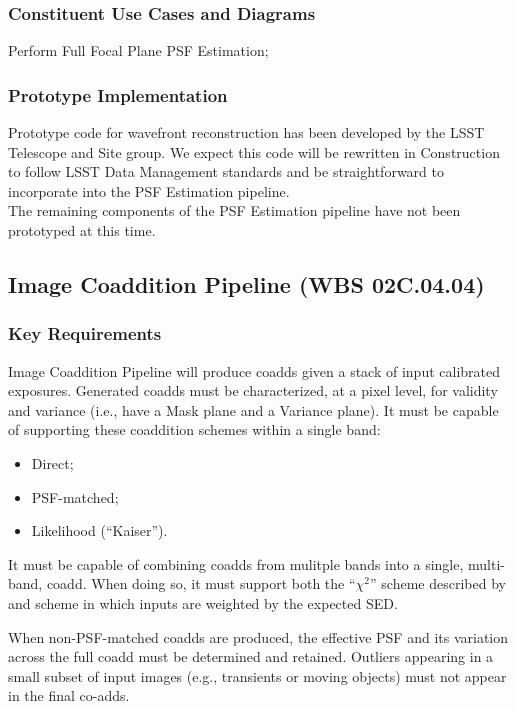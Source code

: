 \documentclass[12pt]{article}
\newcommand{\wbsCoadd}{WBS 02C.04.04}
\begin{document}
\subsubsection{Constituent Use Cases and Diagrams}

Perform Full Focal Plane PSF Estimation;

\subsubsection{Prototype Implementation}

Prototype code for wavefront reconstruction has been developed by the LSST Telescope and Site group. We expect this code will be rewritten in Construction to follow LSST Data Management standards and be straightforward to incorporate into the PSF Estimation pipeline.
\\

The remaining components of the PSF Estimation pipeline have not been prototyped at this time.

\clearpage

\subsection{Image Coaddition Pipeline (\wbsCoadd)}

\subsubsection{Key Requirements}

Image Coaddition Pipeline will produce coadds given a stack of input calibrated exposures. Generated coadds must be characterized, at a pixel level, for validity and variance (i.e., have a Mask plane and a Variance plane). It must be capable of supporting these coaddition schemes within a single band:
\begin{itemize}
    \item{Direct;}
    \item{PSF-matched;}
    \item{Likelihood (``Kaiser'').}
\end{itemize}

It must be capable of combining coadds from mulitple bands into a single, multi-band, coadd. When doing so, it must support both the ``$\chi^2$'' scheme described by \cite{Szalay99} and scheme in which inputs are weighted by the expected SED.

When non-PSF-matched coadds are produced, the effective PSF and its variation across the full coadd must be determined and retained. Outliers appearing in a small subset of input images (e.g., transients or moving objects) must not appear in the final co-adds. %
\end{document}
